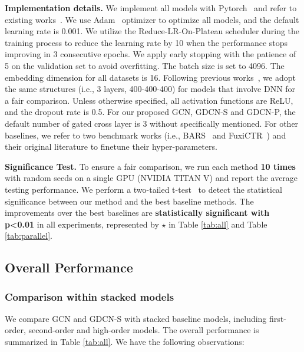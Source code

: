 \documentclass[sigconf]{acmart}
\begin{document}
\textbf{Implementation details.}
We implement all models with Pytorch~\cite{paszke2019pytorch} and refer to existing works~\cite{zhu2022bars, zhu2020fuxictr, chen2021dcap}. We use Adam~\cite{kingma2014adam} optimizer to optimize all models, and the default learning rate is 0.001. We utilize the Reduce-LR-On-Plateau scheduler during the training process to reduce the learning rate by 10 when the performance stops improving in 3 consecutive epochs. We apply early stopping with the patience of 5 on the validation set to avoid overfitting. The batch size is set to 4096. The embedding dimension for all datasets is 16. Following previous works~\cite{guo2017deepfm, cheng2020adaptive, meng2021autopi, song2019autoint, huang2019fibinet, chen2021enhancing}, we adopt the same structures (i.e., 3 layers, 400-400-400) for models that involve DNN for a fair comparison. Unless otherwise specified, all activation functions are ReLU, and the dropout rate is 0.5. For our proposed GCN, GDCN-S and GDCN-P, the default number of gated cross layer is 3 without specifically mentioned. For other baselines, we refer to two benchmark works (i.e., BARS~\cite{zhu2022bars} and FuxiCTR~\cite{zhu2020fuxictr}) and their original literature to finetune their hyper-parameters.


\textbf{Significance Test.} To ensure a fair comparison, we run each method \textbf{10 times} with random seeds on a single GPU (NVIDIA TITAN V) and report the average testing performance. We perform a two-tailed t-test~\cite{liu2019fgcnn,wang2022mcrf,wang2022enhancing} to detect the statistical significance between our method and the best baseline methods. The improvements over the best baselines are \textbf{statistically significant with p<0.01} in all experiments, represented by $\star$ in Table \ref{tab:all} and Table \ref{tab:parallel}. 





\subsection{Overall Performance}
\subsubsection{Comparison within stacked models} 
We compare GCN and GDCN-S with stacked baseline models, including first-order, second-order and high-order models. The overall performance is summarized in Table \ref{tab:all}. We have the following observations:
\end{document}
